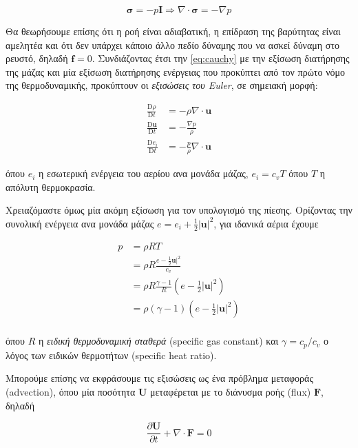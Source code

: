 \begin{equation*}
    \mathbf{\sigma} = -p\mathbf{I} \Rightarrow \nabla \cdot \mathbf{\sigma} = -\nabla p
\end{equation*}

Θα θεωρήσουμε επίσης ότι η ροή είναι αδιαβατική, η επίδραση της βαρύτητας είναι αμελητέα και ότι δεν υπάρχει κάποιο άλλο πεδίο δύναμης που να ασκεί δύναμη στο ρευστό, δηλαδή $\mathbf{f} = 0$.
Συνδιάζοντας έτσι την \eqref{eq:cauchy} με την εξίσωση διατήρησης της μάζας και μία εξίσωση διατήρησης ενέργειας που προκύπτει από τον πρώτο νόμο της θερμοδυναμικής, προκύπτουν οι \emph{εξισώσεις του Euler}, σε σημειακή μορφή:

\begin{align}\label{eq:euler}
    \frac{\mathrm{D}\rho}{\mathrm{D}t} &= -\rho \nabla \cdot \mathbf{u} \\
    \frac{\mathrm{D} \mathbf{u}}{\mathrm{D}t} &= -\frac{\nabla p}{\rho} \\
    \frac{\mathrm{D} e_i}{\mathrm{D}t} &= -\frac{p}{\rho} \nabla \cdot \mathbf{u}
\end{align}

όπου $e_i$ η εσωτερική ενέργεια του αερίου ανα μονάδα μάζας, $e_i = c_v T$ όπου $T$ η απόλυτη θερμοκρασία.

Χρειαζόμαστε όμως μία ακόμη εξίσωση για τον υπολογισμό της πίεσης.
Ορίζοντας την συνολική ενέργεια ανα μονάδα μάζας $e = e_i + \frac{1}{2} |\mathbf{u}|^2$, για ιδανικά αέρια έχουμε

\begin{align*}
    p &= \rho R T \\
      &= \rho R \frac{e - \frac{1}{2} \mathbf{u}|^2}{c_v} \\
      &= \rho R \frac{\gamma - 1}{R} \left( e - \frac{1}{2} |\mathbf{u}|^2 \right) \\
      &= \rho \left(\gamma - 1\right) \left( e - \frac{1}{2} |\mathbf{u}|^2 \right) \\
\end{align*}

όπου $R$ η \emph{ειδική θερμοδυναμική σταθερά} (specific gas constant) και $\gamma = c_p / c_v$ ο λόγος των ειδικών θερμοτήτων (specific heat ratio).

Μπορούμε επίσης να εκφράσουμε τις εξισώσεις ως ένα πρόβλημα μεταφοράς (advection), όπου μία ποσότητα $\mathbf{U}$ μεταφέρεται με το διάνυσμα ροής (flux) $\mathbf{F}$, δηλαδή

\begin{equation*}
    \frac{\partial \mathbf{U}}{\partial t} + \nabla \cdot \mathbf{F} = 0
\end{equation*}

